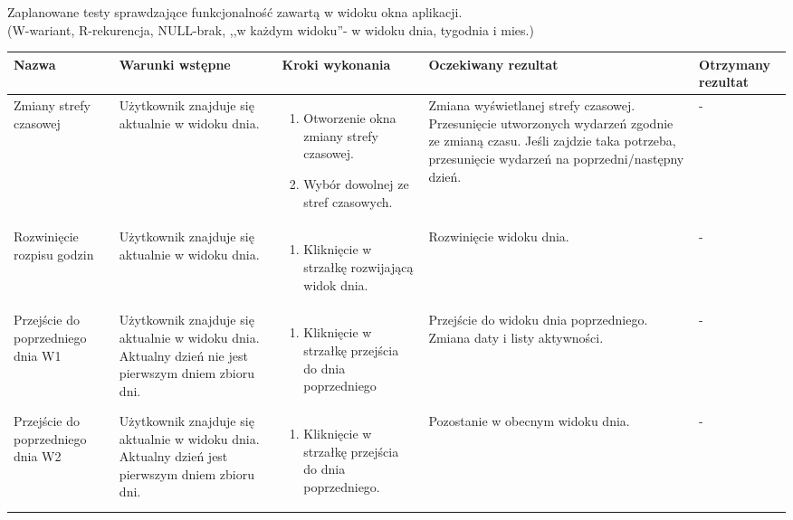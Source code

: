 \documentclass{article}
\begin{document}
\begin{flushleft}
Zaplanowane testy sprawdzające funkcjonalność zawartą w widoku okna aplikacji. \\
(W-wariant, R-rekurencja, NULL-brak, ,,w każdym widoku''- w widoku dnia, tygodnia i mies.)
\setlength\LTleft{-1in}

	\begin{longtable}[H]{| m{3.5cm} | m{3.5cm} | m{3.5cm} | m{3.5cm} | m{3.5cm} |} \hline
	Nazwa & Warunki wstępne & Kroki wykonania & Oczekiwany rezultat & Otrzymany rezultat \\ \hline

	Zmiany strefy czasowej & Użytkownik znajduje się aktualnie w widoku dnia. & \begin{enumerate}[leftmargin =*, topsep=0pt] \item Otworzenie okna zmiany strefy czasowej. \item 
	Wybór dowolnej ze stref czasowych. \end{enumerate} & Zmiana wyświetlanej strefy czasowej. Przesunięcie utworzonych wydarzeń zgodnie ze zmianą czasu. Jeśli zajdzie taka potrzeba, 
	przesunięcie wydarzeń na poprzedni/następny dzień. & - \\ \hline

	 Rozwinięcie rozpisu godzin & Użytkownik znajduje się aktualnie w widoku dnia. & \begin{enumerate}[leftmargin =*, topsep=0pt] \item Kliknięcie w strzałkę rozwijającą widok dnia. 
	\end{enumerate} & Rozwinięcie widoku dnia. & - \\ \hline

	Przejście do poprzedniego dnia W1 & Użytkownik znajduje się aktualnie w widoku dnia. Aktualny dzień nie jest pierwszym dniem zbioru dni. & \begin{enumerate}[leftmargin =*, topsep=0pt] \item 
	Kliknięcie w strzałkę przejścia do dnia poprzedniego \end{enumerate} & Przejście do widoku dnia poprzedniego. Zmiana daty i listy aktywności. & - \\ \hline

	Przejście do poprzedniego dnia W2 & Użytkownik znajduje się aktualnie w widoku dnia. Aktualny dzień jest pierwszym dniem zbioru dni. & \begin{enumerate}[leftmargin =*, topsep=0pt] \item 
	Kliknięcie w strzałkę przejścia do dnia poprzedniego. \end{enumerate} & Pozostanie w obecnym widoku dnia. & - \\ \hline
	

\end{longtable}
\end{flushleft}
\end{document}
